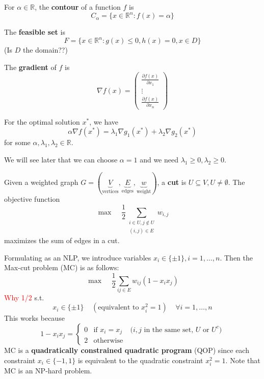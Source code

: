 \begin{definition}[Contour]
    For $\alpha \in \mathbb R$, the \textbf{contour} of a function $f$ is $$C_\alpha = \{ x \in \mathbb R^n: f(x) = \alpha\}$$
\end{definition}
\begin{definition}
    The \textbf{feasible set} is $$F = \{x \in \mathbb R^n: g(x) \leq 0, h(x) = 0, x \in D\}$$ (Is $D$ the domain??)
\end{definition}
\begin{definition}[Gradient]
    The \textbf{gradient} of $f$ is $$\nabla f(x) = 
    \begin{pmatrix} \frac{\partial f(x)}{\partial x_1} \\ \vdots \\ \frac{\partial f(x)}{\partial x_n}\end{pmatrix}$$

    For the optimal solution $x^*$, we have
    $$\alpha \nabla f(x^*) = \lambda_1 \nabla g_1(x^*) + \lambda_2 \nabla g_2(x^*)$$ for some $\alpha, \lambda_1, \lambda_2 \in \mathbb R$.

    We will see later that we can choose $\alpha = 1$ and we need $\lambda_1 \geq 0, \lambda_2 \geq 0$.
\end{definition}
\begin{problem}
    Given a weighted graph $G = (\underbrace{V}_{\text{vertices}}, \underbrace{E}_{\text{edges}}, \underbrace{w}_{\text{weight}})$, a \textbf{cut} is $U \subseteq V, U \neq \emptyset$. The objective function $$\max \;\;\;\; \frac{1}{2} \sum_{\substack{i \in U, j \not \in U \\ (i,j) \in E}} w_{i,j}$$ maximizes the sum of edges in a cut.

    Formulating as an NLP, we introduce variables $x_i \in \{\pm 1\}, i = 1,\ldots, n$. Then the Max-cut problem (MC) is as follows:
    $$\max\;\;\;\; \frac{1}{2} \sum_{ij \in E} w_{ij}(1 - x_ix_j)$$ \textcolor{red}{Why 1/2}
    s.t. $$x_i \in \{\pm 1\}  \;\;\;\;(\text{equivalent to } x^2_i = 1)\;\;\;\; \forall i = 1,\ldots, n$$
    This works because $$1 - x_ix_j = \begin{cases} 0 & \text{if }x_i = x_j \;\;\;\; \text{($i,j$ in the same set, $U$ or $U^c$)} \\
    2 & \text{otherwise}
    \end{cases}$$
    MC is a \textbf{quadratically constrained quadratic program} (QOP) since each constraint $x_i \in \{-1, 1\}$ is equivalent to the quadratic constraint $x^2_i = 1$. Note that MC is an NP-hard problem.
\end{problem}

